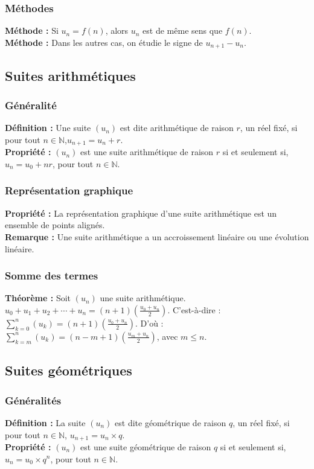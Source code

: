 \documentclass[a4paper,titlepage]{article}
\begin{document}
        \subsubsection{Méthodes}
            \textbf{Méthode :} Si $u_{n}=f\left(n\right)$, alors $u_{n}$ est de même sens que $f\left(n\right)$.\\
            \textbf{Méthode :} Dans les autres cas, on étudie le signe de $u_{n+1}-u_{n}$.
    \subsection{Suites arithmétiques}
        \subsubsection{Généralité}
            \textbf{Définition :} Une suite $\left(u_{n}\right)$ est dite arithmétique de raison $r$, un réel fixé, si pour tout $n\in\mathbb{N}$,\linebreak$u_{n+1}=u_{n}+r$.
            \\
            \textbf{Propriété :} $\left(u_{n}\right)$ est une suite arithmétique de raison $r$ si et seulement si, $u_{n}=u_{0}+nr$, pour tout $n\in\mathbb{N}$.
        \subsubsection{Représentation graphique}
            \textbf{Propriété :} La représentation graphique d’une suite arithmétique est un ensemble de points alignés.
            \\
            \textbf{Remarque :} Une suite arithmétique a un accroissement linéaire ou une évolution linéaire.
        \subsubsection{Somme des termes}
            \textbf{Théorème :} Soit $\left(u_{n}\right)$ une suite arithmétique. $u_{0}+u_{1}+u_{2}+\cdots+u_{n}=\left(n+1\right)\left(\frac{u_{0}+u_{n}}{2}\right)$. C’est-à-dire : $\sum\limits_{k=0}^{n}\left(u_{k}\right)=\left(n+1\right)\left(\frac{u_{0}+u_{n}}{2}\right)$. D’où : $\sum\limits_{k=m}^{n}\left(u_{k}\right)=\left(n-m+1\right)\left(\frac{u_{m}+u_{n}}{2}\right)$, avec $m\leqslant n$.
    \subsection{Suites géométriques}
        \subsubsection{Généralités}
            \textbf{Définition :} La suite $\left(u_{n}\right)$ est dite géométrique de raison $q$, un réel fixé, si pour tout $n\in\mathbb{N}$, $u_{n+1}=u_{n}\times q$.
            \\
            \textbf{Propriété :} $\left(u_{n}\right)$ est une suite géométrique de raison $q$ si et seulement si, $u_{n}=u_{0}\times q^{n}$, pour tout $n\in\mathbb{N}$.
\end{document}
